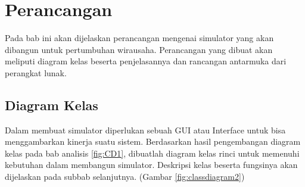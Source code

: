 \chapter{Perancangan}
\label{chap:perancangan}

Pada bab ini akan dijelaskan perancangan mengenai simulator yang akan dibangun untuk pertumbuhan wirausaha. Perancangan yang dibuat akan meliputi diagram kelas beserta penjelasannya dan rancangan antarmuka dari perangkat lunak.


\section{Diagram Kelas}
\label{sec:perancangankelas}

Dalam membuat simulator diperlukan sebuah GUI atau Interface untuk bisa menggambarkan kinerja suatu sistem. Berdasarkan hasil pengembangan diagram kelas pada bab analisis \ref{fig:CD1}, dibuatlah diagram kelas rinci untuk memenuhi kebutuhan dalam membangun simulator. Deskripsi kelas beserta fungsinya akan dijelaskan pada subbab selanjutnya. (Gambar \ref{fig:classdiagram2})

